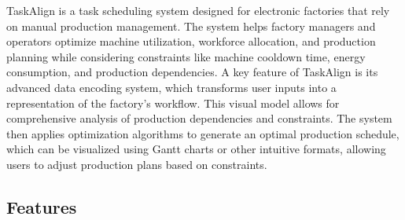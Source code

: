 TaskAlign is a task scheduling system designed for electronic factories that rely on manual production management. The system helps factory managers and operators optimize machine utilization, workforce allocation, and production planning while considering constraints like machine cooldown time, energy consumption, and production dependencies.
A key feature of TaskAlign is its advanced data encoding system, which transforms user inputs into a representation of the factory's workflow. This visual model allows for comprehensive analysis of production dependencies and constraints. The system then applies optimization algorithms to generate an optimal production schedule, which can be visualized using Gantt charts or other intuitive formats, allowing users to adjust production plans based on constraints.

\subsection{Features}
\label{subsection:features}

